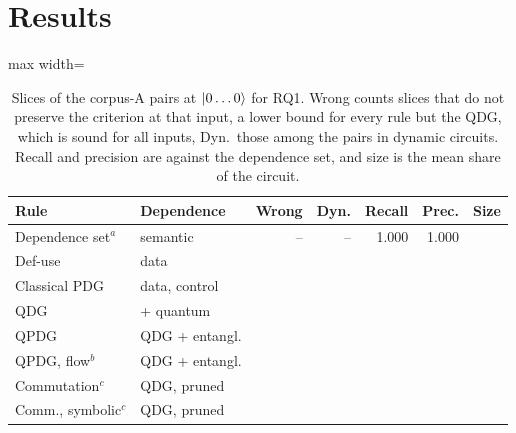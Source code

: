\section{Results}\label{sec:results}

\begin{table}[t]
  \centering
  \caption{Slices of the \numNPairs{} corpus-A pairs at $\lvert 0\dots0\rangle$ for RQ1. Wrong counts slices
  that do not preserve the criterion at that input, a lower bound for every rule but the QDG, which is sound
  for all inputs, Dyn.\ those among the \numNDynamicPairs{} pairs in dynamic
  circuits. Recall and precision are against the dependence set, and size is the mean share of the
  circuit.}
  \label{tab:rq1}
  \footnotesize\setlength{\tabcolsep}{2.6pt}
  \begin{adjustbox}{max width=\columnwidth}
  \begin{tabular}{@{}l l r r r r r@{}}
    \toprule
    Rule & Dependence & Wrong & Dyn. & Recall & Prec. & Size \\
    \midrule
    Dependence set$^{a}$ & semantic            & --                     & --                       & 1.000                 & 1.000                    & \numDepFloor{} \\
    \midrule
    Def-use            & data                  & \numRqOneDuUnsound{}   & \numDuDynamicUnsound{}   & \numRqOneDuRecall{}   & \numRqOneDuPrecision{}   & \numRqOneDuSize{} \\
    Classical PDG      & data, control         & \numCpdgUnsound{}      & \numCpdgDynamicUnsound{} & \numCpdgRecall{}      & \numCpdgPrecision{}      & \numCpdgSize{} \\
    QDG          & + quantum             & \numRqOneLcUnsound{}   & \numLcDynamicUnsound{}   & \numRqOneLcRecall{}   & \numRqOneLcPrecision{}   & \numRqOneLcSize{} \\
    QPDG~\cite{yu2025qpdg} & QDG + entangl.       & \numRqOneYzUnsound{}   & \numYzDynamicUnsound{}   & \numRqOneYzRecall{}   & \numRqOneYzPrecision{}   & \numRqOneYzSize{} \\
    QPDG, flow$^{b}$   & QDG + entangl.        & \numYzfUnsound{}      & \numYzfDynamicUnsound{}  & \numYzfRecall{}       & \numYzfPrecision{}       & \numYzfSize{} \\
    \midrule
    Commutation$^{c}$  & QDG, pruned           & \numLcqUnsound{}       & \numLcqDynamicUnsound{}  & \numLcqRecall{}       & \numLcqPrecision{}       & \numLcqSize{} \\
    Comm., symbolic$^{c}$ & QDG, pruned        & \numLcqsUnsound{}      & \numLcqsDynamicUnsound{} & \numLcqsRecall{}      & \numLcqsPrecision{}      & \numLcqsSize{} \\

\end{tabular}
\end{adjustbox}
\end{table}
